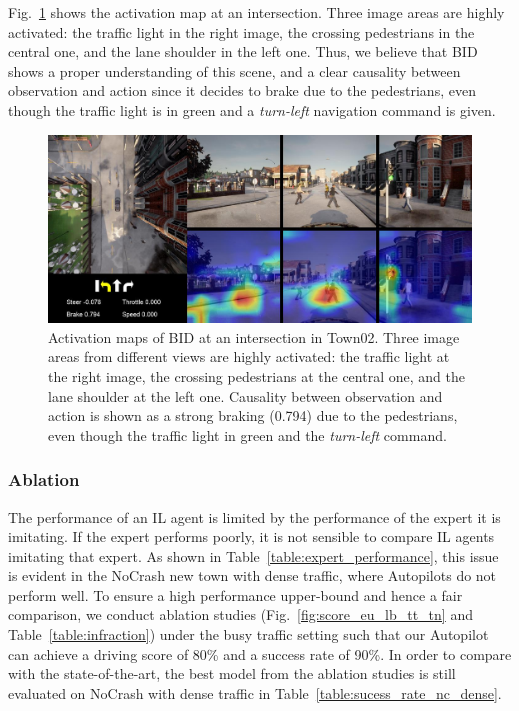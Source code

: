 Fig.~\ref{fig:attention_ped_greed} shows the activation map at an intersection. 
Three image areas are highly activated: the traffic light in the right image, the crossing pedestrians in the central one, and the lane shoulder in the left one. 
Thus, we believe that BID shows a proper understanding of this scene, and a clear causality between observation and action since it decides to brake due to the pedestrians, even though the traffic light is in green and a \emph{turn-left} navigation command is given.

\begin{figure}[ht!]
	\centering
	\includegraphics[width=\linewidth]{fig/attention_ped_greed.jpg}
	\caption{Activation maps of BID at an intersection in Town02. 
		Three image areas from different views are highly activated: 
		the traffic light at the right image, the crossing pedestrians at the central one, and the lane shoulder at the left one. 
		Causality between observation and action is shown as a strong braking (0.794) due to the pedestrians, even though the traffic light in green and the \emph{turn-left} command.}
	\label{fig:attention_ped_greed}
\end{figure}



\subsubsection{Ablation}

\hspace{1pc}The performance of an IL agent is limited by the performance of the expert it is imitating.
If the expert performs poorly, it is not sensible to compare IL agents imitating that expert.
As shown in Table~\ref{table:expert_performance}, this issue is evident in the NoCrash new town with dense traffic, where Autopilots do not perform well. 
To ensure a high performance upper-bound and hence a fair comparison, we conduct ablation studies (Fig.~\ref{fig:score_eu_lb_tt_tn} and Table~\ref{table:infraction}) under the busy traffic setting such that our Autopilot can achieve a driving score of 80\% and a success rate of 90\%. 
In order to compare with the state-of-the-art, the best model from the ablation studies is still evaluated on NoCrash with dense traffic in Table~\ref{table:sucess_rate_nc_dense}.


